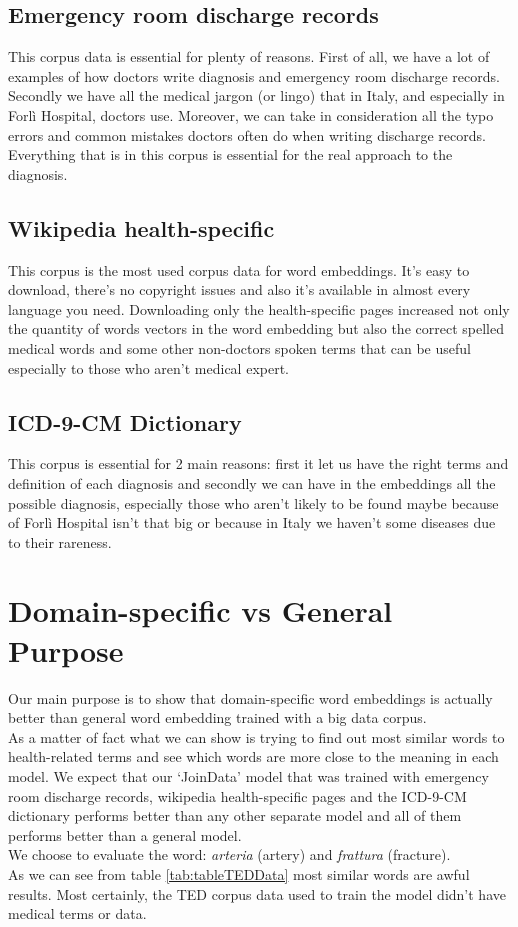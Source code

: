 \subsection{Emergency room discharge records}
This corpus data is essential for plenty of reasons. First of all, we have a lot of examples of how doctors write diagnosis and emergency room discharge records. Secondly we have all the medical jargon (or lingo) that in Italy, and especially in Forlì Hospital, doctors use. Moreover, we can take in consideration all the typo errors and common mistakes doctors often do when writing discharge records. Everything that is in this corpus is essential for the real approach to the diagnosis. 
\subsection{Wikipedia health-specific}
This corpus is the most used corpus data for word embeddings. It's easy to download, there's no copyright issues and also it's available in almost every language you need. Downloading only the health-specific pages increased not only the quantity of words vectors in the word embedding but also the correct spelled medical words and some other non-doctors spoken terms that can be useful especially to those who aren't medical expert.
\subsection{ICD-9-CM Dictionary}
This corpus is essential for 2 main reasons: first it let us have the right terms and definition of each diagnosis and secondly we can have in the embeddings all the possible diagnosis, especially those who aren't likely to be found maybe because of Forlì Hospital isn't that big or because in Italy we haven't some diseases due to their rareness. 
\section{Domain-specific vs General Purpose}

Our main purpose is to show that domain-specific word embeddings is actually better than general word embedding trained with a big data corpus.\\As a matter of fact what we can show is trying to find out most similar words to health-related terms and see which words are more close to the meaning in each model. We expect that our \enquote*{JoinData} model that was trained with emergency room discharge records, wikipedia health-specific pages and the ICD-9-CM dictionary performs better than any other separate model and all of them performs better than a general model.\\
We choose to evaluate the word: \textit{arteria} (artery) and \textit{frattura} (fracture).\\
As we can see from table \ref{tab:tableTEDData} most similar words are awful results. Most certainly, the TED corpus data used to train the model didn't have medical terms or data.\\

